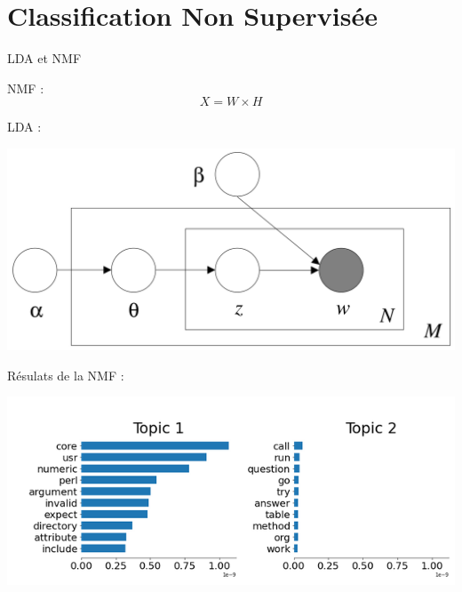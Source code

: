 \documentclass[10pt]{beamer}
\begin{document}
\section{Classification Non Supervisée}
\begin{frame}{LDA et NMF}
    \begin{minipage}{0.48\linewidth}
        NMF : 
        $$ \boxed{ X = W \times H }$$
        \vfill
    \end{minipage}
    \begin{minipage}{0.48\linewidth}
        LDA : 
        \begin{center}
           \includegraphics[width=0.8\linewidth]{illustrations/PGM_LDA_original.png}
        \end{center}        
    \end{minipage}
    Résulats de la NMF : 
    \begin{center}
       \includegraphics[width=0.8\linewidth]{illustrations/coprus_NMF_topics2.png}
    \end{center}           
\end{frame}
\end{document}
